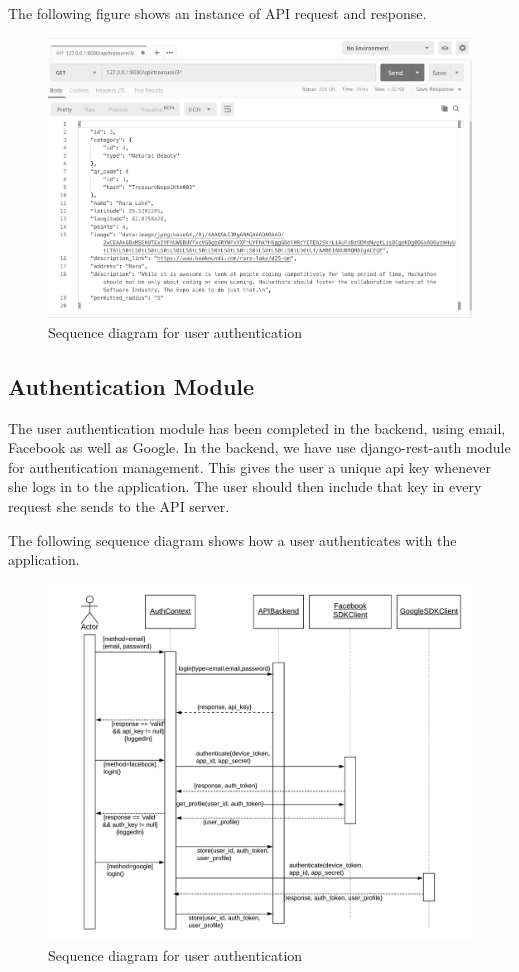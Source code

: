 \documentclass[12pt, a4paper, oneside]{article}
\begin{document}
The following figure shows an instance of API request and response.

\begin{figure}[H]
\includegraphics[width=\linewidth, keepaspectratio]{screenshots/api.png}
\centering
\caption{Sequence diagram for user authentication}
\label{fig:auth-sequence}
\end{figure}


\subsection{Authentication Module}
The user authentication module has been completed in the backend, using email, Facebook as well as Google. In the backend, we have use django-rest-auth module for authentication management. This gives the user a unique api key whenever she logs in to the application. The user should then include that key in every request she sends to the API server.

The following sequence diagram shows how a user authenticates with the application.

\begin{figure}[H]
\includegraphics[width=\linewidth, keepaspectratio]{sequence-diagrams/auth.png}
\centering
\caption{Sequence diagram for user authentication}
\label{fig:auth-sequence}
\end{figure}
\end{document}
